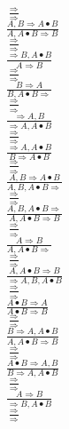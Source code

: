 \documentclass[11pt]{article}
\begin{document}
\begin{center}
\bigskip
\\$\frac{\Rightarrow }{\Rightarrow }$
\bigskip
\\$\frac{A, B\Rightarrow A\bullet B}{A, A\bullet B\Rightarrow B}$
\bigskip
\\$\frac{\Rightarrow }{\Rightarrow }$
\bigskip
\\$\frac{\Rightarrow B, A\bullet B}{A\Rightarrow B}$
\bigskip
\\$\frac{\Rightarrow }{\Rightarrow }$
\bigskip
\\$\frac{B\Rightarrow A}{B, A\bullet B\Rightarrow }$
\bigskip
\\$\frac{\Rightarrow }{\Rightarrow }$
\bigskip
\\$\frac{\Rightarrow A, B}{\Rightarrow A, A\bullet B}$
\bigskip
\\$\frac{\Rightarrow }{\Rightarrow }$
\bigskip
\\$\frac{\Rightarrow A, A\bullet B}{B\Rightarrow A\bullet B}$
\bigskip
\\$\frac{\Rightarrow }{\Rightarrow }$
\bigskip
\\$\frac{A, B\Rightarrow A\bullet B}{A, B, A\bullet B\Rightarrow }$
\bigskip
\\$\frac{\Rightarrow }{\Rightarrow }$
\bigskip
\\$\frac{A, B, A\bullet B\Rightarrow }{A, A\bullet B\Rightarrow B}$
\bigskip
\\$\frac{\Rightarrow }{\Rightarrow }$
\bigskip
\\$\frac{A\Rightarrow B}{A, A\bullet B\Rightarrow }$
\bigskip
\\$\frac{\Rightarrow }{\Rightarrow }$
\bigskip
\\$\frac{A, A\bullet B\Rightarrow B}{\Rightarrow A, B, A\bullet B}$
\bigskip
\\$\frac{\Rightarrow }{\Rightarrow }$
\bigskip
\\$\frac{A\bullet B\Rightarrow A}{A\bullet B\Rightarrow B}$
\bigskip
\\$\frac{\Rightarrow }{\Rightarrow }$
\bigskip
\\$\frac{B\Rightarrow A, A\bullet B}{A, A\bullet B\Rightarrow B}$
\bigskip
\\$\frac{\Rightarrow }{\Rightarrow }$
\bigskip
\\$\frac{A\bullet B\Rightarrow A, B}{B\Rightarrow A, A\bullet B}$
\bigskip
\\$\frac{\Rightarrow }{\Rightarrow }$
\bigskip
\\$\frac{A\Rightarrow B}{\Rightarrow B, A\bullet B}$
\bigskip
\\$\frac{\Rightarrow }{\Rightarrow }$

\end{center}
\end{document}
